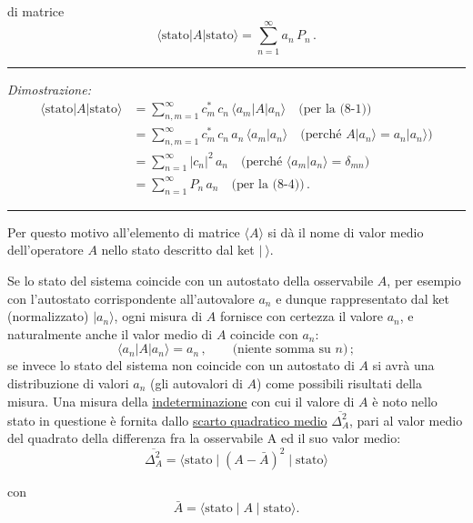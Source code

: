 \documentclass[11pt, a4paper]{book}
\numberwithin{equation}{section}
\begin{document}
di matrice
\begin{equation}
\langle\text{stato}|A|\text{stato}\rangle = \sum_{n=1}^{\infty}a_n\,P_n\,.
\end{equation}

\hrule\medskip
\textit{Dimostrazione:}
\begin{align*}
\langle\text{stato}|A|\text{stato}\rangle
&= \sum_{n,m=1}^{\infty} c_m^*\,c_n\,\langle a_m|A|a_n\rangle \quad \text{(per la (8-1))}\\
&= \sum_{n,m=1}^{\infty} c_m^*\,c_n\,a_n\,\langle a_m|a_n\rangle \quad \text{(perché }A|a_n\rangle=a_n|a_n\rangle\text{)}\\
&= \sum_{n=1}^{\infty}|c_n|^2\,a_n \quad \text{(perché }\langle a_m|a_n\rangle=\delta_{mn}\text{)}\\
&= \sum_{n=1}^{\infty}P_n\,a_n \quad \text{(per la (8-4))}\,.
\end{align*}
\medskip\hrule\medskip

Per questo motivo all'elemento di matrice $\langle A\rangle$ si dà il nome di valor medio dell'operatore $A$ nello stato descritto dal ket $|\ \rangle$.

Se lo stato del sistema coincide con un autostato della osservabile $A$, per esempio con l'autostato corrispondente all'autovalore $a_n$ e dunque rappresentato dal ket (normalizzato) $|a_n\rangle$, ogni misura di $A$ fornisce con certezza il valore $a_n$, e naturalmente anche il valor medio di $A$ coincide con $a_n$:
\begin{equation}
\langle a_n|A|a_n\rangle = a_n\,, \qquad \text{(niente somma su }n\text{)}\,;
\end{equation}
se invece lo stato del sistema non coincide con un autostato di $A$ si avrà una distribuzione di valori $a_n$ (gli autovalori di $A$) come possibili risultati della misura. Una misura della \uline{indeterminazione} con cui il valore di $A$ è noto nello stato in questione è fornita dallo \uline{scarto quadratico medio} $\overline{\Delta_A^2}$, pari al valor medio del quadrato della differenza fra la osservabile A ed il suo valor medio:
\begin{equation}
\overline{\Delta^2_A} = \langle \text{stato} \mid (A - \bar{A})^2 \mid \text{stato} \rangle
\end{equation}

con
\begin{equation}
\bar{A} = \langle \text{stato} \mid A \mid \text{stato} \rangle.
\end{equation}
\end{document}
